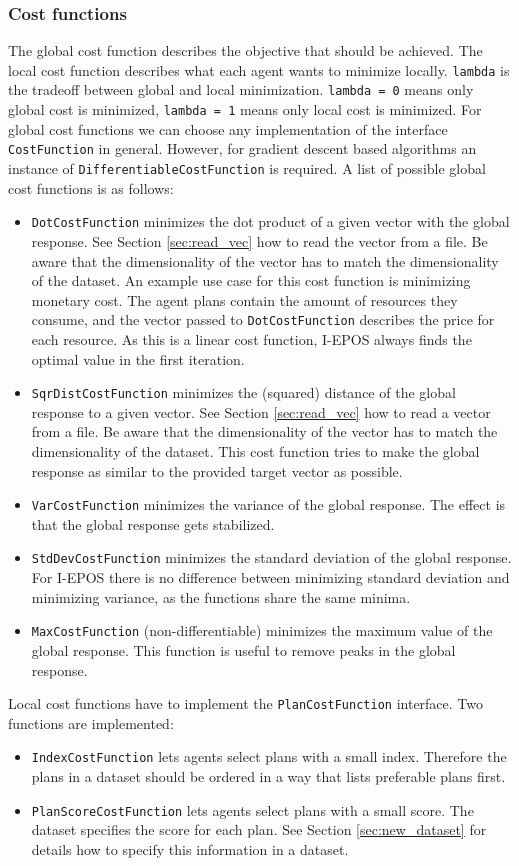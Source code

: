 \documentclass[11pt]{article} %
\newcommand{\code}{\texttt}
\begin{document}
\subsubsection*{Cost functions}
The global cost function describes the objective that should be achieved. The local cost function describes what each agent wants to minimize locally. \code{lambda} is the tradeoff between global and local minimization. \code{lambda = 0} means only global cost is minimized, \code{lambda = 1} means only local cost is minimized.
For global cost functions we can choose any implementation of the interface \code{CostFunction} in general. However, for gradient descent based algorithms an instance of \code{DifferentiableCostFunction} is required. A list of possible global cost functions is as follows:
\begin{itemize}
	\item \code{DotCostFunction} minimizes the dot product of a given vector with the global response. See Section \ref{sec:read_vec} how to read the vector from a file. Be aware that the dimensionality of the vector has to match the dimensionality of the dataset.
An example use case for this cost function is minimizing monetary cost. The agent plans contain the amount of resources they consume, and the vector passed to \code{DotCostFunction} describes the price for each resource.
As this is a linear cost function, I-EPOS always finds the optimal value in the first iteration.
	\item \code{SqrDistCostFunction} minimizes the (squared) distance of the global response to a given vector. See Section \ref{sec:read_vec} how to read a vector from a file. Be aware that the dimensionality of the vector has to match the dimensionality of the dataset.
This cost function tries to make the global response as similar to the provided target vector as possible.
	\item \code{VarCostFunction} minimizes the variance of the global response. The effect is that the global response gets stabilized.
	\item \code{StdDevCostFunction} minimizes the standard deviation of the global response. For I-EPOS there is no difference between minimizing standard deviation and minimizing variance, as the functions share the same minima.
	\item \code{MaxCostFunction} (non-differentiable) minimizes the maximum value of the global response. This function is useful to remove peaks in the global response.
\end{itemize}
Local cost functions have to implement the \code{PlanCostFunction} interface. Two functions are implemented:
\begin{itemize}
	\item \code{IndexCostFunction} lets agents select plans with a small index. Therefore the plans in a dataset should be ordered in a way that lists preferable plans first.
	\item \code{PlanScoreCostFunction} lets agents select plans with a small score. The dataset specifies the score for each plan. See Section \ref{sec:new_dataset} for details how to specify this information in a dataset.
\end{itemize}
\end{document}
